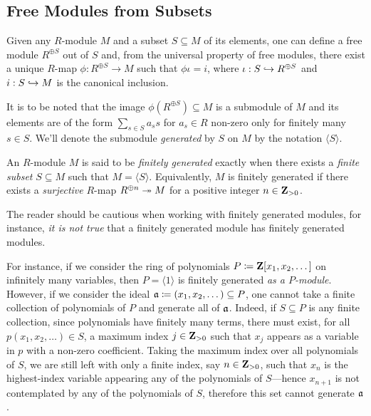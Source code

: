 \subsection{Free Modules from Subsets}

Given any \(R\)-module \(M\) and a subset \(S \subseteq M\) of its elements, one
can define a free module \(R^{\oplus S}\) out of \(S\) and, from the universal
property of free modules, there exist a unique \(R\)-map \(\phi: R^{\oplus S}
\to M\) such that \(\phi \iota = i\), where \(\iota: S \hookrightarrow R^{\oplus S}\) and
\(i: S \hookrightarrow M\) is the canonical inclusion.

It is to be noted that the image \(\phi(R^{\oplus S}) \subseteq M\) is a
submodule of \(M\) and its elements are of the form \(\sum_{s \in S} a_s s\) for
\(a_s \in R\) non-zero only for finitely many \(s \in S\). We'll denote the
submodule \emph{generated} by \(S\) on \(M\) by the notation
\(\langle S \rangle\).


\begin{definition}
\label{def:finitely-generated-module}
An \(R\)-module \(M\) is said to be \emph{finitely generated} exactly when there
exists a \emph{finite subset} \(S \subseteq M\) such that
\(M = \langle S \rangle\). Equivalently, \(M\) is finitely generated if there
exists a \emph{surjective} \(R\)-map \(R^{\oplus n} \twoheadrightarrow M\) for a positive
integer \(n \in \mathbf{Z}_{>0}\).
\end{definition}

\begin{remark}[Submodules]
\label{rem:submodules-finitely-generated}
The reader should be cautious when working with finitely generated modules, for
instance, \emph{it is not true} that a finitely generated module has finitely
generated modules.

For instance, if we consider the ring of polynomials
\(P \coloneq \mathbf{Z}[x_1, x_2, \dots]\) on infinitely many variables, then
\(P = \langle 1 \rangle\) is finitely generated \emph{as a
  \(P\)-module}. However, if we consider the ideal
\(\mathfrak{a} \coloneq (x_1, x_2, \dots) \subseteq P\), one cannot take a finite
collection of polynomials of \(P\) and generate all of \(\mathfrak{a}\). Indeed, if
\(S \subseteq P\) is any finite collection, since polynomials have finitely many
terms, there must exist, for all \(p(x_1, x_2, \dots) \in S\), a maximum index
\(j \in \mathbf{Z}_{>0}\) such that \(x_j\) appears as a variable in \(p\) with a
non-zero coefficient. Taking the maximum index over all polynomials of \(S\), we
are still left with only a finite index, say \(n \in \mathbf{Z}_{>0}\), such that
\(x_n\) is the highest-index variable appearing any of the polynomials of
\(S\)---hence \(x_{n+1}\) is not contemplated by any of the polynomials of
\(S\), therefore this set cannot generate \(\mathfrak{a}\).
\end{remark}

